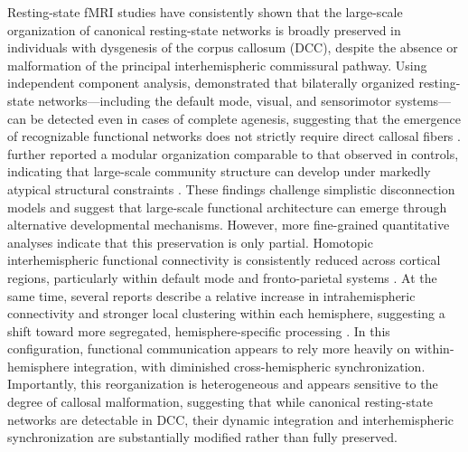 \documentclass{article}
\begin{document}
Resting-state fMRI studies have consistently shown that the large-scale organization of canonical resting-state networks is broadly preserved in individuals with dysgenesis of the corpus callosum (DCC), despite the absence or malformation of the principal interhemispheric commissural pathway. Using independent component analysis, \citep{Tyszka2011} demonstrated that bilaterally organized resting-state networks—including the default mode, visual, and sensorimotor systems—can be detected even in cases of complete agenesis, suggesting that the emergence of recognizable functional networks does not strictly require direct callosal fibers \citep{Tyszka2011}. \citep{Owen2013} further reported a modular organization comparable to that observed in controls, indicating that large-scale community structure can develop under markedly atypical structural constraints \citep{Owen2013}. These findings challenge simplistic disconnection models and suggest that large-scale functional architecture can emerge through alternative developmental mechanisms. However, more fine-grained quantitative analyses indicate that this preservation is only partial. Homotopic interhemispheric functional connectivity is consistently reduced across cortical regions, particularly within default mode and fronto-parietal systems \citep{Hinkley2012}. At the same time, several reports describe a relative increase in intrahemispheric connectivity and stronger local clustering within each hemisphere, suggesting a shift toward more segregated, hemisphere-specific processing \citep{Yuan2020,Shi2021}. In this configuration, functional communication appears to rely more heavily on within-hemisphere integration, with diminished cross-hemispheric synchronization. Importantly, this reorganization is heterogeneous and appears sensitive to the degree of callosal malformation, suggesting that while canonical resting-state networks are detectable in DCC, their dynamic integration and interhemispheric synchronization are substantially modified rather than fully preserved.
\end{document}
